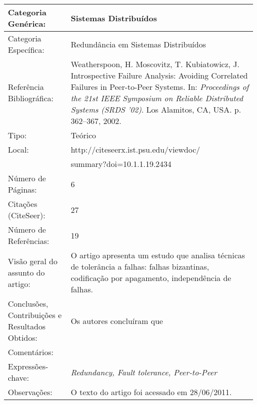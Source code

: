 \documentclass[10pt,a4paper]{article}
\begin{document}
\begin{center}
\begin{tabular}{|p{5cm}||p{10cm}|}
\hline
Categoria Genérica: & Sistemas Distribuídos\\\hline
Categoria Específica: &  Redundância em Sistemas Distribuídos\\\hline
Referência Bibliográfica: & Weatherspoon, H. Moscovitz, T. Kubiatowicz, J. Introspective Failure Analysis: Avoiding Correlated Failures in Peer-to-Peer Systems. In:  \emph{Proceedings of the 21st IEEE Symposium on Reliable Distributed Systems (SRDS '02)}. Los Alamitos, CA, USA. p. 362--367, 2002.\\\hline
Tipo: & Teórico\\\hline
Local: & http://citeseerx.ist.psu.edu/viewdoc/\\ &summary?doi=10.1.1.19.2434\\\hline
Número de Páginas: & 6\\\hline
Citações (CiteSeer): & 27\\\hline
Número de Referências: & 19\\\hline
Visão geral do assunto do artigo: & O artigo apresenta um estudo que analisa técnicas de tolerância a falhas: falhas bizantinas, codificação por apagamento, independência de falhas.\\\hline
Conclusões, Contribuições e Resultados Obtidos: & Os autores concluíram que \\\hline
Comentários: & \\\hline
Expressões-chave: & \emph{Redundancy, Fault tolerance, Peer-to-Peer}\\\hline
Observações: & O texto do artigo foi acessado em 28/06/2011.\\\hline

\end{tabular}
\end{center}
\end{document}
